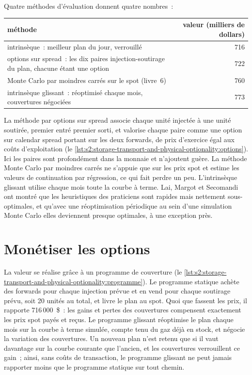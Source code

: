 Quatre méthodes d'évaluation donnent quatre nombres~:

\begin{center}
\small
\begin{tabular}{@{}p{11.4cm}r@{}}
\toprule
méthode & valeur (milliers de dollars)\\
\midrule
intrinsèque~: meilleur plan du jour, verrouillé & 716\\
options sur spread~: les dix paires injection-soutirage du plan, chacune étant une option & 722\\
Monte Carlo par moindres carrés sur le spot (livre~6) & 760\\
intrinsèque glissant~: réoptimisé chaque mois, couvertures négociées & 773\\
\bottomrule
\end{tabular}
\end{center}

La méthode par options sur spread associe chaque unité injectée à une unité soutirée, premier entré premier sorti, et valorise chaque paire comme une option sur calendar spread portant sur les
deux forwards, de prix d'exercice égal aux coûts d'exploitation (le \cref{lst:s2:storage-transport-and-physical-optionality:options}). Ici les paires sont profondément dans la monnaie
et n'ajoutent guère. La méthode Monte Carlo par moindres carrés ne s'appuie que sur les prix spot et estime les valeurs de continuation par régression, ce qui fait perdre un peu.
L'intrinsèque glissant utilise chaque mois toute la courbe à terme. Lai, Margot et Secomandi ont montré que les heuristiques des praticiens sont rapides mais nettement
sous-optimales, et qu'avec une réoptimisation périodique au sein d'une simulation Monte Carlo elles deviennent presque optimales, à une exception près.

\section{Monétiser les options}

La valeur se réalise grâce à un programme de couverture (le \cref{lst:s2:storage-transport-and-physical-optionality:programme}). Le programme statique achète
des forwards pour chaque injection prévue et en vend pour chaque soutirage prévu, soit 20 unités au total, et livre le plan au spot. Quoi que
fassent les prix, il rapporte 716\,000~\$~: les gains et pertes des couvertures compensent exactement les prix spot payés et reçus. Le programme glissant réoptimise le
plan chaque mois sur la courbe à terme simulée, compte tenu du gaz déjà en stock, et négocie la variation des couvertures. Un nouveau plan n'est retenu que si
il vaut davantage sur la courbe courante que l'ancien, et les couvertures verrouillent ce gain~; ainsi, sans coûts de transaction, le programme glissant ne peut jamais rapporter moins que
le programme statique sur tout chemin.

